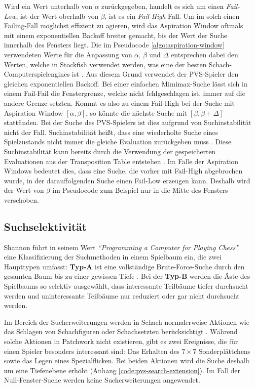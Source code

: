 Wird ein Wert unterhalb von $\alpha$ zurückgegeben, handelt es sich um einen \emph{Fail-Low}, ist der Wert oberhalb von $\beta$, ist es ein \emph{Fail-High} Fall. Um im solch einen Failing-Fall möglichst effizient zu agieren, wird das Aspiration Window oftmals mit einem exponentiellen Backoff breiter gemacht, bis der Wert der Suche innerhalb des Fensters liegt. Die im Pseudocode \ref{algo:aspiration-window} verwendeten Werte für die Anpassung von $\alpha$, $\beta$ und $\Delta$ entsprechen dabei den Werten, welche in Stockfish verwendet werden, was eine der besten Schach-Computerspielengines ist \cite{2024.StockfishBackoff} \cite{2024.Stockfish}. Aus diesem Grund verwendet der \ac{PVS}-Spieler den gleichen exponentiellen Backoff. Bei einer einfachen Mimimax-Suche lässt sich in einem Fail-Fail die Fenstergrenze, welche nicht fehlgeschlagen ist, immer auf die andere Grenze setzten. Kommt es also zu einem Fail-High bei der Suche mit Aspiration Window $\left[\alpha, \beta\right]$, so könnte die nächste Suche mit $\left[\beta, \beta + \Delta\right]$ stattfinden. Bei der Suche des \ac{PVS}-Spielers ist dies aufgrund von Suchinstabilität nicht der Fall. Suchinstabilität heißt, dass eine wiederholte Suche eines Spielzustands nicht immer die gleiche Evaluation zurückgeben muss \cite{2003.SearchInstability}. Diese Suchinstabilität kann bereits durch die Verwendung der gespeicherten Evaluationen aus der Transposition Table entstehen \cite{2003.SearchInstability}. Im Falle der Aspiration Windows bedeutet dies, dass eine Suche, die vorher mit Fail-High abgebrochen wurde, in der darauffolgenden Suche einen Fail-Low erzeugen kann. Deshalb wird der Wert von $\beta$ im Pseudocode zum Beispiel nur in die Mitte des Fensters verschoben.

\subsection{Suchselektivität}

Shannon führt in seinem Wert \emph{\enquote{Programming a Computer for Playing Chess}} eine Klassifizierung der Suchmethoden in einem Spielbaum ein, die zwei Haupttypen umfasst: \textbf{Typ-A} ist eine vollständige Brute-Force-Suche durch den gesamten Baum bis zu einer gewissen Tiefe \cite[S. 8]{1950.ChessShannon}. Bei der \textbf{Typ-B} werden die Äste des Spielbaums so selektiv ausgewählt, dass interessante Teilbäume tiefer durchsucht werden und uninteressante Teilbäume nur reduziert oder gar nicht durchsucht werden.

Im Bereich der Sucherweiterungen werden in Schach normalerweise Aktionen wie das Schlagen von Schachfiguren oder Schachsetzten berücksichtigt \cite[S. 14]{1950.ChessShannon}\cite{2023.StockfishTerminology}\cite{2002.SearchExtensions}. Während solche Aktionen in Patchwork nicht existieren, gibt es zwei Ereignisse, die für einen Spieler besonders interessant sind: Das Erhalten des $7\times 7$ Sonderplättchens sowie das Legen eines Spezialflicken. Bei beiden Aktionen wird die Suche deshalb um eine Tiefenebene erhöht (Anhang \ref{code:pvs-search-extension}). Im Fall der Null-Fenster-Suche werden keine Sucherweiterungen angewendet.

